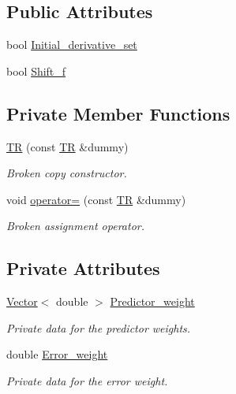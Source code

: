 \subsection*{Public Attributes}
\begin{DoxyCompactItemize}
\item 
bool \hyperlink{classoomph_1_1TR_ae665d492f58240c9786f719f6baa2ddf}{Initial\+\_\+derivative\+\_\+set}
\item 
bool \hyperlink{classoomph_1_1TR_a3b60f7e2fc8d15a3e6ed4ea29d59ffdd}{Shift\+\_\+f}
\end{DoxyCompactItemize}
\subsection*{Private Member Functions}
\begin{DoxyCompactItemize}
\item 
\hyperlink{classoomph_1_1TR_a1675eb2c3334926a9fa91c9969d6205e}{TR} (const \hyperlink{classoomph_1_1TR}{TR} \&dummy)
\begin{DoxyCompactList}\small\item\em Broken copy constructor. \end{DoxyCompactList}\item 
void \hyperlink{classoomph_1_1TR_ae121ff7b44a9e0f2f5a6ff90a13e6f20}{operator=} (const \hyperlink{classoomph_1_1TR}{TR} \&dummy)
\begin{DoxyCompactList}\small\item\em Broken assignment operator. \end{DoxyCompactList}\end{DoxyCompactItemize}
\subsection*{Private Attributes}
\begin{DoxyCompactItemize}
\item 
\hyperlink{classoomph_1_1Vector}{Vector}$<$ double $>$ \hyperlink{classoomph_1_1TR_a32b1f670090854c3e28611ee5b3cf220}{Predictor\+\_\+weight}
\begin{DoxyCompactList}\small\item\em Private data for the predictor weights. \end{DoxyCompactList}\item 
double \hyperlink{classoomph_1_1TR_a5dbcb466fcff21c9780c0cf1b8971bc4}{Error\+\_\+weight}
\begin{DoxyCompactList}\small\item\em Private data for the error weight. \end{DoxyCompactList}\end{DoxyCompactItemize}
